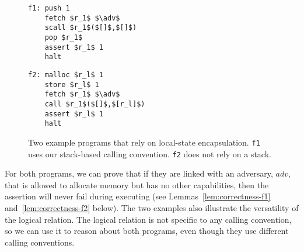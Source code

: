 \documentclass[format=acmsmall, review=true, screen=true]{acmart}
\newcommand\lau[1]{{\color{purple} \sf \footnotesize {LS: #1}}\\}
\newcommand\lars[1]{{\color{purple} \sf \footnotesize {LB: #1}}\\}
\renewcommand\lau[1]{}
\renewcommand\lars[1]{}
\newcommand{\var}[1]{\mathit{#1}}
\newcommand{\adv}{\var{adv}}
\begin{document}
\begin{figure}[t]
  \centering

  \begin{minipage}[t]{4.1cm}
  \begin{lstlisting}
f1: push 1
    fetch $r_1$ $\adv$
    scall $r_1$($[]$,$[]$)
    pop $r_1$
    assert $r_1$ 1
    halt
  \end{lstlisting}
  \end{minipage}
  \begin{minipage}[t]{4.1cm}
  \begin{lstlisting}
f2: malloc $r_l$ 1
    store $r_l$ 1
    fetch $r_1$ $\adv$
    call $r_1$($[]$,$[r_l]$)
    assert $r_l$ 1
    halt
  \end{lstlisting}
  \end{minipage}
  \caption{Two example programs that rely on local-state encapsulation. \texttt{f1} uses our stack-based calling convention. \texttt{f2} does not rely on a stack.}
  \label{fig:prog-f1-and-f2}
\end{figure}

For both programs, we can prove that if they are linked with an adversary,
$\adv$, that is allowed to allocate memory but has no other capabilities, then
the assertion will never fail during executing (see
Lemmas~\ref{lem:correctness-f1} and~\ref{lem:correctness-f2} below).
The two examples also illustrate the versatility of the logical relation.
The logical relation is not specific to any calling convention, so we can use it to reason
about both programs, even though they use different calling conventions.
\end{document}
